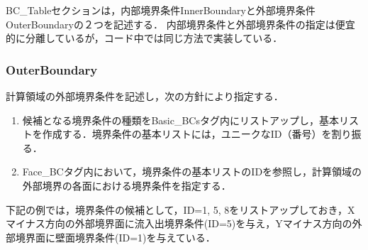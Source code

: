 \noindent BC\_Tableセクションは，内部境界条件InnerBoundaryと外部境界条件OuterBoundaryの２つを記述する．
内部境界条件と外部境界条件の指定は便宜的に分離しているが，コード中では同じ方法で実装している．

%
\subsubsection{OuterBoundary}
計算領域の外部境界条件を記述し，次の方針により指定する．

\begin{enumerate}
\item 候補となる境界条件の種類をBasic\_BCsタグ内にリストアップし，基本リストを作成する．境界条件の基本リストには，ユニークなID（番号）を割り振る．
\item Face\_BCタグ内において，境界条件の基本リストのIDを参照し，計算領域の外部境界の各面における境界条件を指定する．
\end{enumerate}

\noindent 下記の例では，境界条件の候補として，ID=1, 5, 8をリストアップしておき，Xマイナス方向の外部境界面に流入出境界条件(ID=5)を与え，Yマイナス方向の外部境界面に壁面境界条件(ID=1)を与えている．

